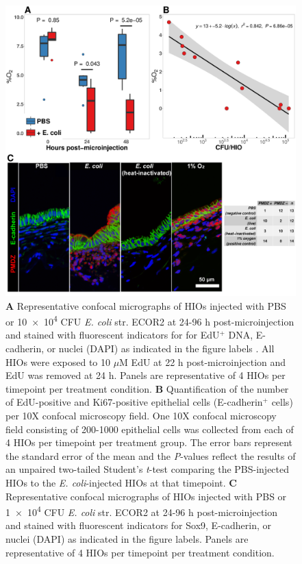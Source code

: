 \documentclass[9pt,lineo]{elife}
\begin{document}
\begin{figure}
\begin{fullwidth}
\centering
\includegraphics[width=0.85\linewidth]{./figures/figure3/figure3_multipanel.pdf}
\caption{\textbf{A} Representative confocal micrographs of HIOs injected with PBS or \num{10e4} CFU \textit{E. coli} str. ECOR2 at 24-96 h post-microinjection and stained with fluorescent indicators for for EdU$^{+}$ DNA, E-cadherin, or nuclei (DAPI) as indicated in the figure labels . All HIOs were exposed to 10 $\mu$M EdU at 22 h post-microinjection and EdU was removed at 24 h. Panels are representative of 4 HIOs per timepoint per treatment condition. \textbf{B} Quantification of the number of EdU-positive and Ki67-positive epithelial cells (E-cadherin$^{+}$ cells) per 10X confocal microscopy field. One 10X confocal microscopy field consisting of 200-1000 epithelial cells was collected from each of 4 HIOs per timepoint per treatment group. The error bars represent the standard error of the mean and the \textit{P}-values reflect the results of an unpaired two-tailed Student's \textit{t}-test comparing the PBS-injected HIOs to the \textit{E. coli}-injected HIOs at that timepoint. \textbf{C} Representative confocal micrographs of HIOs injected with PBS or \num{1e4} CFU \textit{E. coli} str. ECOR2 at 24-96 h post-microinjection and stained with fluorescent indicators for Sox9, E-cadherin, or nuclei (DAPI) as indicated in the figure labels. Panels are representative of 4 HIOs per timepoint per treatment condition.}
\label{fig:fullwidth}
\end{fullwidth}
\end{figure}
\end{document}
